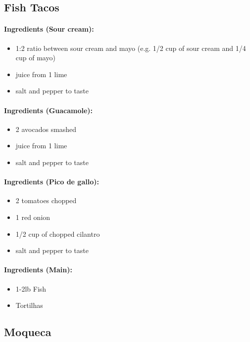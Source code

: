 \documentclass{article}
\begin{document}
\subsection{Fish Tacos} 

\paragraph{Ingredients (Sour cream):}
\begin{itemize}
    \item 1:2 ratio between sour cream and mayo (e.g. 1/2 cup of sour cream and 1/4 cup of mayo)
    \item juice from 1 lime
    \item salt and pepper to taste
\end{itemize}  

\paragraph{Ingredients (Guacamole):}
\begin{itemize}
    \item 2 avocados smashed
    \item juice from 1 lime
    \item salt and pepper to taste
\end{itemize}  

\paragraph{Ingredients (Pico de gallo):}
\begin{itemize}
    \item 2 tomatoes chopped
    \item 1 red onion
    \item 1/2 cup of chopped cilantro
    \item salt and pepper to taste
\end{itemize}  

\paragraph{Ingredients (Main):}
\begin{itemize}
    \item 1-2lb Fish
    \item Tortilhas
\end{itemize}   

\subsection{Moqueca}
\end{document}
